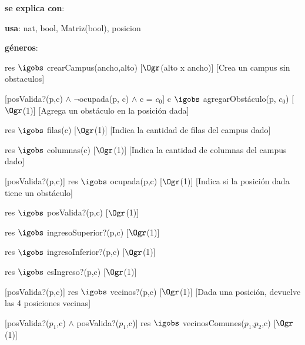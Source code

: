 \begin{Interfaz}
  
	\textbf{se explica con}: 
	
	\textbf{usa}: nat, bool, Matriz(bool), posicion
	
	\textbf{géneros}: 
	

	{res $\igobs$ crearCampus(ancho,alto)}
	[$\Ogr$(alto x ancho)]
	[Crea un campus sin obstaculos]
	
	[posValida?(p,c) $\land$ $\neg$ocupada(p, c) $\land$ c = $c_{0}$]
	{c $\igobs$ agregarObstáculo(p, $c_{0}$)}
	[$\Ogr$(1)]
	[Agrega un obstáculo en la posición dada]
	
	{res $\igobs$ filas(c)}
	[$\Ogr$(1)]
	[Indica la cantidad de filas del campus dado]
	
	{res $\igobs$ columnas(c)}
	[$\Ogr$(1)]
	[Indica la cantidad de columnas del campus dado]	
	
	[posValida?(p,c)]
	{res $\igobs$ ocupada(p,c)}
	[$\Ogr$(1)]
	[Indica si la posición dada tiene un obstáculo]
	
	{res $\igobs$ posValida?(p,c)}
	[$\Ogr$(1)]
	
	{res $\igobs$ ingresoSuperior?(p,c)}
	[$\Ogr$(1)]
	
	{res $\igobs$ ingresoInferior?(p,c)}
	[$\Ogr$(1)]
	
	{res $\igobs$ esIngreso?(p,c)}
	[$\Ogr$(1)]
	
	[posValida?(p,c)]
	{res $\igobs$ vecinos?(p,c)}
	[$\Ogr$(1)]
	[Dada una posición, devuelve las 4 posiciones vecinas]
		
	[posValida?($p_1$,c) $\land$ posValida?($p_1$,c)]
	{res $\igobs$ vecinosComunes($p_1$,$p_2$,c)}
	[$\Ogr$(1)]
	

\end{Interfaz}
